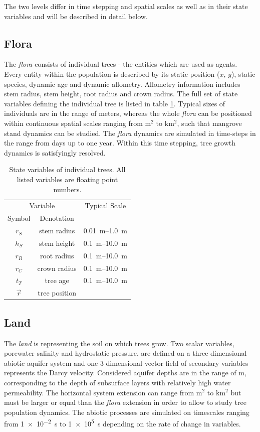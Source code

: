\documentclass[manusscript, 12p, authoryear]{elsarticle}
\begin{document}
The two levels differ in time stepping and spatial scales as well as in their state variables and will be described in detail below.
\subsection{Flora}
The \textit{flora} consists of individual trees - the entities which are used as agents.
Every entity within the population is described by its static position ($x$, $y$), static species, dynamic age and dynamic allometry.
Allometry information includes stem radius, stem height, root radius and crown radius.
The full set of state variables defining the individual tree is listed in table \ref{tab_bettina_variables}.
Typical sizes of individuals are in the range of meters, whereas the whole \textit{flora} can be positioned within continuous spatial scales ranging from $\mathrm{m^2}$ to $\mathrm{km^2}$, such that mangrove stand dynamics can be studied.
The \textit{flora} dynamics are simulated in time-steps in the range from days up to one year.
Within this time stepping, tree growth dynamics is satisfyingly resolved.
\begin{table}[h]
\centering
\begin{tabular}{|c|c|c|}
\hline 
\multicolumn{2}{|c|}{Variable} & Typical Scale \\
Symbol & Denotation & \\ 
\hline 
$r_S$ & stem radius  & \SIrange{0.01}{1.0}{m}  \\ 
\hline 
$h_S$ & stem height  & \SIrange{0.1}{10.0}{m}  \\ 
\hline 
$r_R$ & root radius  & \SIrange{0.1}{10.0}{m}  \\ 
\hline 
$r_C$ & crown radius  & \SIrange{0.1}{10.0}{m}  \\ 
\hline 
$t_T$ & tree age  & \SIrange{0.1}{10.0}{m} \\ 
\hline 
$\vec{r}$ & tree position  &   \\ 
\hline 
\end{tabular} 
\caption{State variables of individual trees.
All listed variables are floating point numbers.}\label{tab_bettina_variables}
\end{table}
\subsection{Land}
The \textit{land} is representing the soil on which trees grow.
Two scalar variables, porewater salinity and hydrostatic pressure, are defined on a three dimensional abiotic aquifer system and one 3 dimensional vector field of secondary variables represents the Darcy velocity.
Considered aquifer depths are in the range of $\mathrm{m}$, corresponding to the depth of subsurface layers with relatively high water permeability.
The horizontal system extension can range from $\mathrm{m^2}$ to $\mathrm{km^2}$ but must be larger or equal than the \textit{flora} extension in order to allow to study tree population dynamics.
The abiotic processes are simulated on timescales ranging from \SI{1e-2}{s} to \SI{1e5}{s} depending on the rate of change in variables.
\end{document}
